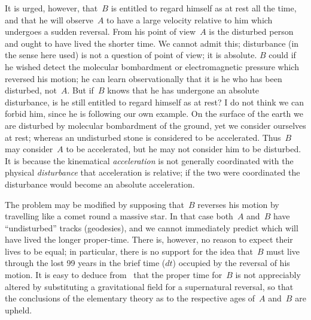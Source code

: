 \documentclass[12pt]{book}
\begin{document}
It is urged, however, that~$B$ is entitled to regard himself as at rest all the time,
and that he will observe~$A$ to have a large velocity relative to him which undergoes a sudden reversal.
From his point of view~$A$ is the disturbed person and ought to have lived the shorter time.
We cannot admit this; disturbance (in the sense here used) is not a question of point of view;
it is absolute.
$B$ could if he wished detect the molecular bombardment or electromagnetic pressure which reversed his motion;
he can learn observationally that it is he who has been disturbed, not~$A$.
But if~$B$ knows that he has undergone an absolute disturbance, is he still entitled to regard himself as at rest?
I do not think we can forbid him, since he is following our own example.
On the surface of the earth we are disturbed by molecular bombardment of the ground,
yet we consider ourselves at rest; whereas an undisturbed stone is considered to be accelerated.
Thus~$B$ may consider~$A$ to be accelerated, but he may not consider him to be disturbed.
It is because the kinematical \emph{acceleration} is not generally coordinated with the physical \emph{disturbance}
that acceleration is relative; if the two were coordinated the disturbance would become an absolute acceleration.

The problem may be modified by supposing that~$B$ reverses his motion by travelling like a comet round a massive star.
In that case both~$A$ and~$B$ have ``undisturbed'' tracks (geodesies), and we cannot immediately predict which will
have lived the longer proper\hyp{}time.
There is, however, no reason to expect their lives to be equal; in particular, there is no support for the idea
that~$B$ must live through the lost 99 years in the brief time ($dt$) occupied by the reversal of his motion.
It is easy to deduce from~ that the proper time for~$B$ is not appreciably altered by substituting
a gravitational field for a supernatural reversal, so that the conclusions of the elementary theory as to the
respective ages of~$A$ and~$B$ are upheld.

\end{document}
